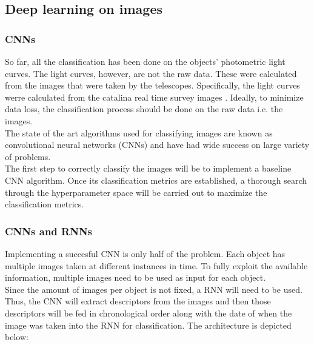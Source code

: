 \subsection{Deep learning on images}

\subsubsection{CNNs}

So far, all the classification has been done on the objects' photometric light curves. The light curves, however, are not the raw data. These were calculated from the images that were taken by the telescopes. Specifically, the light curves werre calculated from the catalina real time survey images \cite{catalinaImages}. Ideally, to minimize data loss, the classification process should be done on the raw data i.e. the images.\\ 

The state of the art algorithms used for classifying images are known as convolutional neural networks (CNNs) \cite{CNN} and have had wide success on large variety of problems.\\

The first step to correctly classify the images will be to implement a baseline CNN algorithm. Once its classification  metrics are established, a thorough search through the hyperparameter space will be carried out to maximize the classification metrics.

\subsubsection{CNNs and RNNs}\label{NNarchitecture}

Implementing a succesful CNN is only half of the problem. Each object has multiple images taken at different instances in time. To fully exploit the available information, multiple images need to be used as input for each object.\\

Since the amount of images per object is not fixed, a RNN will need to be used. Thus, the CNN will extract descriptors from the images and then those descriptors will be fed in chronological order along with the date of when the image was taken into the RNN for classification. The architecture is depicted below:

